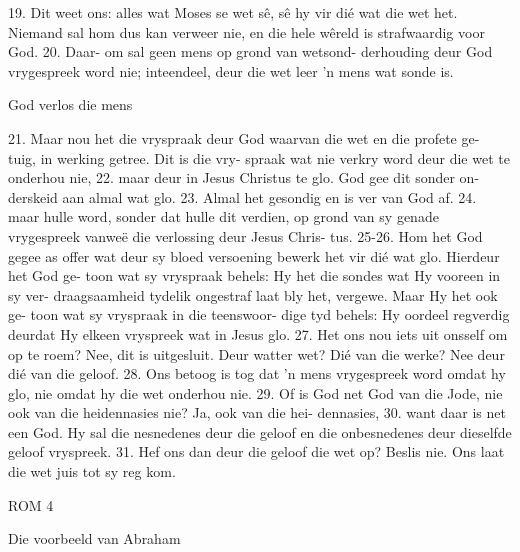 19.  Dit weet ons:  alles wat Moses se wet sê,
sê hy vir dié wat die wet het.  Niemand sal 
hom dus kan verweer nie, en die hele 
wêreld is strafwaardig voor God.  20.  Daar-
om sal geen mens op grond van wetsond-
derhouding deur God vrygespreek word 
nie;  inteendeel, deur die wet leer 'n mens
wat sonde is.

God verlos die mens

21.  Maar nou het die vryspraak deur 
God waarvan die wet en die profete ge-
tuig, in werking getree.  Dit is die vry-
spraak wat nie verkry word deur die wet 
te onderhou nie, 22.  maar deur in Jesus 
Christus te glo.  God gee dit sonder on-
derskeid aan almal wat glo.  23.  Almal het 
gesondig en is ver van God af.  24.  maar
hulle word, sonder dat hulle dit verdien, 
op grond van sy genade vrygespreek 
vanweë die verlossing deur Jesus Chris-
tus.  25-26.  Hom het God gegee as offer wat 
deur sy bloed versoening bewerk het 
vir dié wat glo.  Hierdeur het God ge-
toon wat sy vryspraak behels:  Hy het
die sondes wat Hy vooreen in sy ver-
draagsaamheid tydelik ongestraf laat 
bly het, vergewe.  Maar Hy het ook ge-
toon wat sy vryspraak in die teenswoor-
dige tyd behels:  Hy oordeel regverdig 
deurdat Hy elkeen vryspreek wat in Jesus 
glo.
27.  Het ons nou iets uit onsself om op te 
roem?  Nee, dit is uitgesluit.  Deur watter 
wet?  Dié van die werke?  Nee deur dié 
van die geloof.  28.  Ons betoog is tog dat 'n 
mens vrygespreek word omdat hy glo, 
nie omdat hy die wet onderhou nie.  29.  Of 
is God net God van die Jode, nie ook van 
die heidennasies nie?  Ja, ook van die hei-
dennasies, 30.  want daar is net een God.  
Hy sal die nesnedenes deur die geloof en 
die onbesnedenes deur dieselfde geloof 
vryspreek.  31.  Hef ons dan deur die geloof
die wet op?  Beslis nie.  Ons laat die wet 
juis tot sy reg kom.


ROM 4

Die voorbeeld van Abraham

